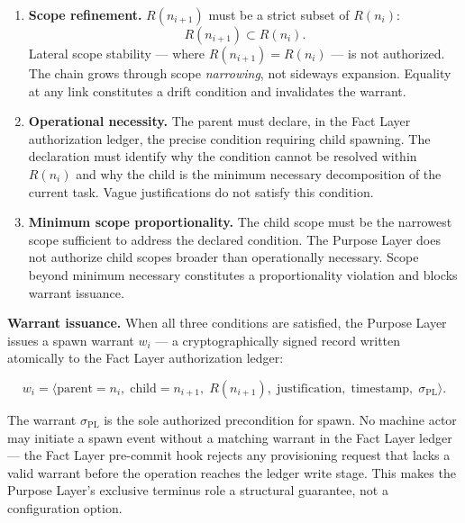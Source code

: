 \begin{enumerate}
    \item[(P1)] \textbf{Scope refinement.} $R(n_{i+1})$ must be a strict subset of $R(n_i)$:
    \begin{equation}
    R(n_{i+1}) \subset R(n_i).
    \label{eq:rs-scope-refinement}
    \end{equation}
    Lateral scope stability — where $R(n_{i+1}) = R(n_i)$ — is not authorized. The chain grows through scope \emph{narrowing}, not sideways expansion. Equality at any link constitutes a drift condition and invalidates the warrant.

    \item[(P2)] \textbf{Operational necessity.} The parent must declare, in the Fact Layer authorization ledger, the precise condition requiring child spawning. The declaration must identify why the condition cannot be resolved within $R(n_i)$ and why the child is the minimum necessary decomposition of the current task. Vague justifications do not satisfy this condition.

    \item[(P3)] \textbf{Minimum scope proportionality.} The child scope must be the narrowest scope sufficient to address the declared condition. The Purpose Layer does not authorize child scopes broader than operationally necessary. Scope beyond minimum necessary constitutes a proportionality violation and blocks warrant issuance.
\end{enumerate}

\medskip
\noindent\textbf{Warrant issuance.} When all three conditions are satisfied, the Purpose Layer issues a spawn warrant $w_i$ — a cryptographically signed record written atomically to the Fact Layer authorization ledger:

\begin{equation}
w_i = \bigl\langle
\text{parent}=n_i,\;
\text{child}=n_{i+1},\;
R(n_{i+1}),\;
\text{justification},\;
\text{timestamp},\;
\sigma_{\text{PL}}
\bigr\rangle .
\label{eq:spawn-warrant}
\end{equation}

The warrant $\sigma_{\text{PL}}$ is the sole authorized precondition for spawn. No machine actor may initiate a spawn event without a matching warrant in the Fact Layer ledger — the Fact Layer pre-commit hook rejects any provisioning request that lacks a valid warrant before the operation reaches the ledger write stage. This makes the Purpose Layer's exclusive terminus role a structural guarantee, not a configuration option.

